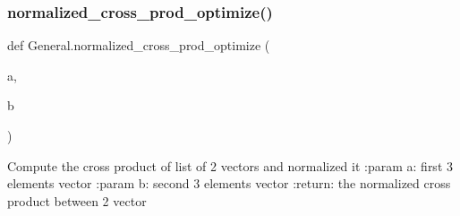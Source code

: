 \subsubsection{normalized\+\_\+cross\+\_\+prod\+\_\+optimize()}
{\footnotesize\ttfamily def General.\+normalized\+\_\+cross\+\_\+prod\+\_\+optimize (\begin{DoxyParamCaption}\item[{}]{a,  }\item[{}]{b }\end{DoxyParamCaption})}

\begin{DoxyVerb}Compute the cross product of list of 2 vectors and normalized it
:param a: first 3 elements vector
:param b: second 3 elements vector
:return: the normalized cross product between 2 vector
\end{DoxyVerb}
 